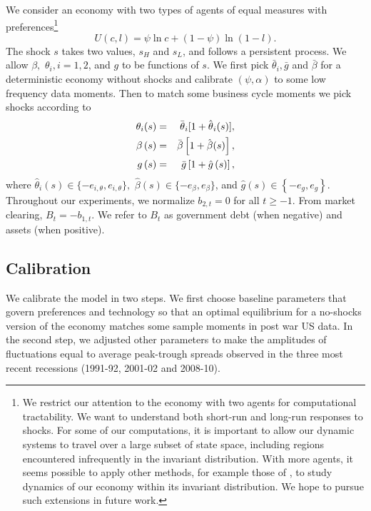 \documentclass[thmsb,11pt]{article}
\begin{document}
\smallskip We consider an economy with two types of agents of equal measures with preferences\footnote{%
We restrict our attention to the economy with two agents for computational
tractability. We want to understand both short-run and long-run
responses to shocks.  For some of our computations,  it is important to allow our
dynamic systems to travel over a large subset of state space, including regions encountered infrequently in the invariant distribution.
With more agents, it seems  possible to apply other methods,  for example those of  \cite{Judd2011}, to study dynamics of our economy within its invariant
distribution. We hope to pursue such extensions in  future work.}
\begin{equation*}
U\left( c,l\right) =\psi \ln c+\left( 1-\psi \right) \ln \left( 1-l\right) .
\end{equation*}%
The shock $s$   takes two values, $s_{H}$ and $s_{L}$, and follows a persistent
process. We allow $\beta ,$ $\theta _{i}, i=1,2$, and $g$ to be
functions of $s.$ We first pick $\bar{\theta}_{i},\bar{g}$
and $\bar{\beta}$ for a deterministic economy without shocks and calibrate $%
\left( \psi ,\alpha \right) $ to some low frequency  data moments. Then to match some business cycle moments we
pick shocks  according to
\begin{eqnarray}\label{eqn:newstar}
\theta _{i}(s) &=&\bar{\theta}_{i}[1+{\hat{\theta}}_{i}(s)], \cr
\beta \left( s\right) &=&\bar{\beta}\left[ 1+\hat{\beta}(s)\right] , \cr
g\left( s\right) &=&\bar{g}\left[ 1+\hat{g}\left( s\right) \right] ,
\end{eqnarray}%
where $\hat{\theta}_{i}\left( s\right) \in \{-e_{i,\theta },e_{i,\theta }\},$
$\hat{\beta}\left( s\right) \in \{-e_{\beta },e_{\beta }\}$, and $\hat{g}%
\left( s\right) \in \left\{ -e_{g},e_{g}\right\} .$ Throughout  our
experiments, we normalize $b_{2,t}=0$ for all $t\geq -1$. From market
clearing,  $B_{t}=-b_{1,t}$.  We refer to $B_{t}$ as
government debt (when negative) and  assets (when positive).

\smallskip

\subsection{\protect\smallskip Calibration}

\smallskip We calibrate the model in two steps. We first choose baseline parameters
that govern preferences and technology so  that an optimal equilibrium for a no-shocks version of the economy matches some sample moments in post war US data.  In the second step, we adjusted other parameters  to make the amplitudes of
fluctuations equal to average peak-trough spreads observed in
the  three most recent recessions (1991-92, 2001-02 and 2008-10).
\end{document}
